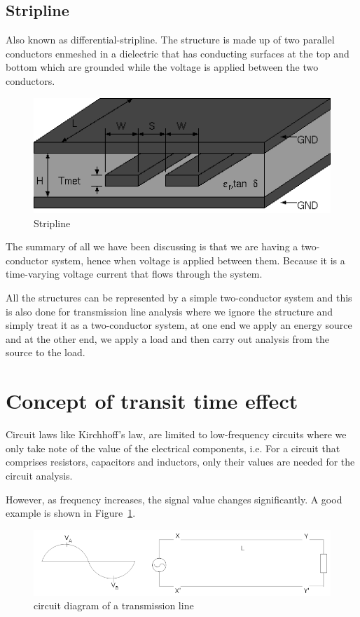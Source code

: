 \subsection{Stripline} 
Also known as differential-stripline. The structure is made up of two parallel conductors enmeshed in a dielectric that has conducting surfaces at the top and bottom which are grounded while the voltage is applied between the two conductors.
\begin{figure}[h]
\centering
\includegraphics[width=1\linewidth]{./graphics/stripline}
\caption{ Stripline}
\end{figure}

The summary of all we have been discussing is that we are having a two-conductor system, hence when voltage is applied between them. Because it is a time-varying voltage current that flows through the system.

All the structures can be represented by a simple two-conductor system and this is also done for transmission line analysis where we ignore the structure and simply treat it as a two-conductor system, at one end we apply an energy source and at the other end, we apply a load and then carry out analysis from the source to the load.

\section{Concept of transit time effect }
Circuit laws like Kirchhoff’s law, are limited to low-frequency circuits where we only take note of the value of the electrical components, i.e. For a circuit that comprises resistors, capacitors and inductors, only their values are needed for the circuit analysis.

However, as frequency increases, the signal value changes significantly. A good example is shown in Figure~\ref{fig:first}.

\begin{figure}[h]
\centering
\includegraphics[width=1\linewidth]{./graphics/first}
\caption{circuit diagram of a transmission line}
\label{fig:first}
\end{figure}

